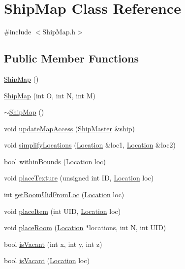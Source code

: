 \hypertarget{classShipMap}{\section{Ship\-Map Class Reference}
\label{classShipMap}
}


{\ttfamily \#include $<$Ship\-Map.\-h$>$}

\subsection*{Public Member Functions}
\begin{DoxyCompactItemize}
\item 
\hyperlink{classShipMap_af52a69332839e08c8f4c6e24758f32da}{Ship\-Map} ()
\item 
\hyperlink{classShipMap_a0c3e21f65831db22a2c276f54b2584f7}{Ship\-Map} (int O, int N, int M)
\item 
\hyperlink{classShipMap_a82afc59f9e7ed5b8d208de36bab9236c}{$\sim$\-Ship\-Map} ()
\item 
void \hyperlink{classShipMap_a7c66418320a5bb788dbbe3a122e76cd7}{update\-Map\-Access} (\hyperlink{classShipMaster}{Ship\-Master} \&ship)
\item 
void \hyperlink{classShipMap_a2ff8a4864984373340f94eaed37debe7}{simplify\-Locations} (\hyperlink{structLocation}{Location} \&loc1, \hyperlink{structLocation}{Location} \&loc2)
\item 
bool \hyperlink{classShipMap_a6817875f83a1ae67fe9124823b80b4b1}{within\-Bounds} (\hyperlink{structLocation}{Location} loc)
\item 
void \hyperlink{classShipMap_a01d56312b189102d019a1da898957b73}{place\-Texture} (unsigned int I\-D, \hyperlink{structLocation}{Location} loc)
\item 
int \hyperlink{classShipMap_ae3df616ce12eb77874e27ae82331e131}{get\-Room\-Uid\-From\-Loc} (\hyperlink{structLocation}{Location} loc)
\item 
void \hyperlink{classShipMap_a7d2147c38abb30590644e2dbc3af94ea}{place\-Item} (int U\-I\-D, \hyperlink{structLocation}{Location} loc)
\item 
void \hyperlink{classShipMap_aa9c0f0f672b58f5ce32e2052432d5145}{place\-Room} (\hyperlink{structLocation}{Location} $\ast$locations, int N, int U\-I\-D)
\item 
bool \hyperlink{classShipMap_af80dd87cdd6c203a0870c3cbdb498418}{is\-Vacant} (int x, int y, int z)
\item 
bool \hyperlink{classShipMap_a0c89267eede90614d46a33cd7129b1d0}{is\-Vacant} (\hyperlink{structLocation}{Location} loc)

\end{DoxyCompactItemize}
